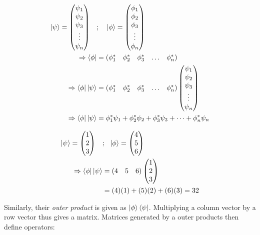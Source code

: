 \begin{equation}
    \begin{split}
        \ket{\psi} = \left(\begin{matrix}\psi_1 \\ \psi_2 \\ \psi_3 \\ \vdots \\ \psi_n\end{matrix}\right) \ \ \ &; \ \ \ \ket{\phi} = \left(\begin{matrix}\phi_1 \\ \phi_2 \\\phi_3 \\ \vdots \\ \phi_n\end{matrix}\right) 
        \\ \Rightarrow \bra{\phi} &= \begin{matrix}(\phi_1^{*} & \phi_2^{*} & \phi_3^{*} & \dots & \phi_n^{*})\end{matrix}
        \\ \Rightarrow \bra{\phi} \ket{\psi} &= \begin{matrix}(\phi_1^{*} & \phi_2^{*} & \phi_3^{*} & \dots & \phi_n^{*})\end{matrix} \left(\begin{matrix}\psi_1 \\ \psi_2 \\ \psi_3 \\ \vdots \\ \psi_n\end{matrix}\right)
        \\ \Rightarrow \bra{\phi} \ket{\psi} &= \phi_1^{*} \psi_1  +  \phi_2^{*} \psi_2 +  \phi_3^{*} \psi_3 + \dots + \phi_n^{*} \psi_n 
    \end{split}
\end{equation}

\begin{example}
    \begin{equation}
        \begin{split}
            \ket{\psi} = \left(\begin{matrix}1 \\ 2 \\ 3\end{matrix}\right) \ \ \ &; \ \ \ket{\phi} = \left(\begin{matrix}4\\5\\6\end{matrix}\right) 
            \\ \Rightarrow \bra{\phi} \ket{\psi} &= \begin{matrix}(4 & 5 & 6)\end{matrix} \left(\begin{matrix}1\\2\\3\end{matrix}\right)
            \\ &= (4)(1) + (5)(2) +(6)(3) = 32
        \end{split}
    \end{equation}

\end{example}

Similarly, their \emph{outer product} is given as $\ket{\phi} \bra{\psi} $. 
Multiplying a column vector by a row vector thus gives a matrix. 
Matrices generated by a outer products then define operators: 
    
